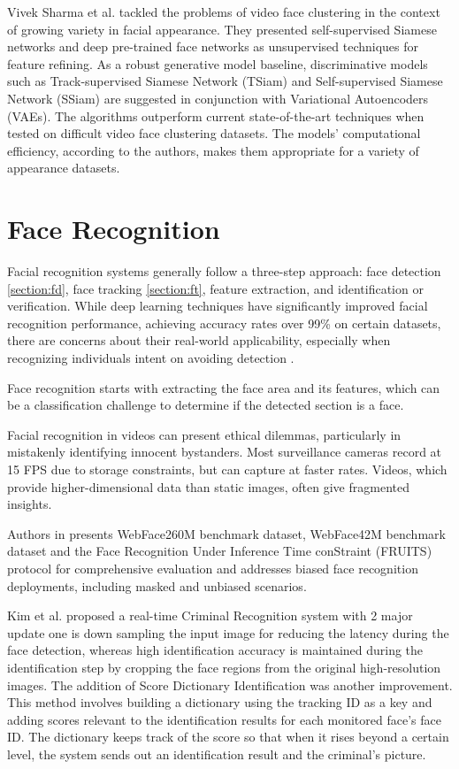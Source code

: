 Vivek Sharma et al. \cite{sharma_video_2020} tackled the problems of video face clustering in the context of growing variety in facial appearance. They presented self-supervised Siamese networks and deep pre-trained face networks as unsupervised techniques for feature refining. As a robust generative model baseline, discriminative models such as Track-supervised Siamese Network (TSiam) and Self-supervised Siamese Network (SSiam) are suggested in conjunction with Variational Autoencoders (VAEs). The algorithms outperform current state-of-the-art techniques when tested on difficult video face clustering datasets. The models' computational efficiency, according to the authors, makes them appropriate for a variety of appearance datasets.

\section{Face Recognition} \label{section:fr}
Facial recognition systems generally follow a three-step approach: face detection \ref{section:fd}, face tracking \ref{section:ft}, feature extraction, and identification or verification. While deep learning techniques have significantly improved facial recognition performance, achieving accuracy rates over 99\% on certain datasets, there are concerns about their real-world applicability, especially when recognizing individuals intent on avoiding detection \cite{kim_surveillance_2023}.

Face recognition starts with extracting the face area and its features, which can be a classification challenge to determine if the detected section is a face.

Facial recognition in videos can present ethical dilemmas, particularly in mistakenly identifying innocent bystanders. Most surveillance cameras record at 15 FPS due to storage constraints, but can capture at faster rates. Videos, which provide higher-dimensional data than static images, often give fragmented insights.

Authors in \cite{zhu_webface260m_2023} presents WebFace260M benchmark dataset, WebFace42M benchmark dataset and the Face Recognition Under Inference Time conStraint (FRUITS) protocol for comprehensive evaluation and addresses biased face recognition deployments, including masked and unbiased scenarios. 

Kim et al. \cite{kim_facial_2023} proposed a real-time Criminal Recognition system with 2 major update one is down sampling the input image for reducing the latency during the face detection, whereas high identification accuracy is maintained during the identification step by cropping the face regions from the original high-resolution images. The addition of Score Dictionary Identification was another improvement. This method involves building a dictionary using the tracking ID as a key and adding scores relevant to the identification results for each monitored face's face ID. The dictionary keeps track of the score so that when it rises beyond a certain level, the system sends out an identification result and the criminal's picture.

